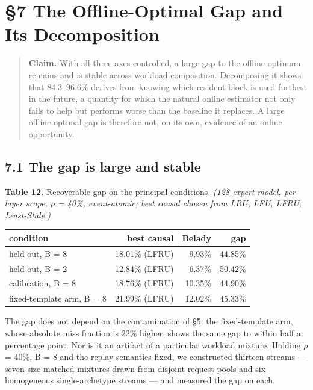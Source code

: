 \documentclass[
  10pt,
  letterpaper,
  10pt]{article}
\newcounter{none} %
\begin{document}
\section{§7 The Offline-Optimal Gap and Its
Decomposition}\label{the-offline-optimal-gap-and-its-decomposition}

\begin{quote}
\textbf{Claim.} With all three axes controlled, a large gap to the
offline optimum remains and is stable across workload composition.
Decomposing it shows that 84.3--96.6\% derives from knowing which
resident block is used furthest in the future, a quantity for which the
natural online estimator not only fails to help but performs worse than
the baseline it replaces. A large offline-optimal gap is therefore not,
on its own, evidence of an online opportunity.
\end{quote}

\subsection{7.1 The gap is large and
stable}\label{the-gap-is-large-and-stable}

\textbf{Table 12.} Recoverable gap on the principal conditions.
\emph{(128-expert model, per-layer scope, \(\rho\) = 40\%, event-atomic;
best causal chosen from LRU, LFU, LFRU, Least-Stale.)}

{\def\LTcaptype{none} %
\begin{longtable}[]{@{}lrrr@{}}
\toprule\noalign{}
condition & best causal & Belady & gap \\
\midrule\noalign{}
\endhead
\bottomrule\noalign{}
\endlastfoot
held-out, B = 8 & 18.01\% (LFRU) & 9.93\% & 44.85\% \\
held-out, B = 2 & 12.84\% (LFRU) & 6.37\% & 50.42\% \\
calibration, B = 8 & 18.76\% (LFRU) & 10.35\% & 44.90\% \\
fixed-template arm, B = 8 & 21.99\% (LFRU) & 12.02\% & 45.33\% \\
\end{longtable}
}

The gap does not depend on the contamination of §5: the fixed-template
arm, whose absolute miss fraction is 22\% higher, shows the same gap to
within half a percentage point. Nor is it an artifact of a particular
workload mixture. Holding \(\rho\) = 40\%, B = 8 and the replay
semantics fixed, we constructed thirteen streams --- seven size-matched
mixtures drawn from disjoint request pools and six homogeneous
single-archetype streams --- and measured the gap on each.
\end{document}
